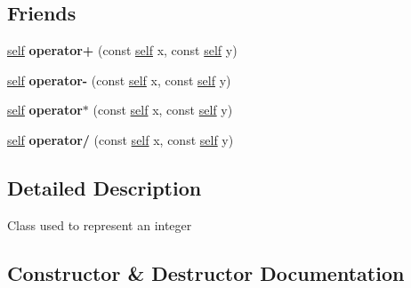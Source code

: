 \subsection*{Friends}
\begin{DoxyCompactItemize}
\item 
\mbox{\label{classez_1_1objects_1_1Integer_ac219ecb06730e7707b9bb78b5da63c3b}} 
\hyperlink{classez_1_1objects_1_1Integer}{self} {\bfseries operator+} (const \hyperlink{classez_1_1objects_1_1Integer}{self} x, const \hyperlink{classez_1_1objects_1_1Integer}{self} y)
\item 
\mbox{\label{classez_1_1objects_1_1Integer_a6750cba02a1d652b1bd892bfba555e50}} 
\hyperlink{classez_1_1objects_1_1Integer}{self} {\bfseries operator-\/} (const \hyperlink{classez_1_1objects_1_1Integer}{self} x, const \hyperlink{classez_1_1objects_1_1Integer}{self} y)
\item 
\mbox{\label{classez_1_1objects_1_1Integer_a4f9af882c7a074ed8e1f8da41bd31dc9}} 
\hyperlink{classez_1_1objects_1_1Integer}{self} {\bfseries operator$\ast$} (const \hyperlink{classez_1_1objects_1_1Integer}{self} x, const \hyperlink{classez_1_1objects_1_1Integer}{self} y)
\item 
\mbox{\label{classez_1_1objects_1_1Integer_aa69c5e8b6898bb99a6f4d6e8962560c8}} 
\hyperlink{classez_1_1objects_1_1Integer}{self} {\bfseries operator/} (const \hyperlink{classez_1_1objects_1_1Integer}{self} x, const \hyperlink{classez_1_1objects_1_1Integer}{self} y)
\end{DoxyCompactItemize}


\subsection{Detailed Description}
Class used to represent an integer 

\subsection{Constructor \& Destructor Documentation}
\mbox{\label{classez_1_1objects_1_1Integer_affb53a3df3747d3571f59533fb806a7f}} 
